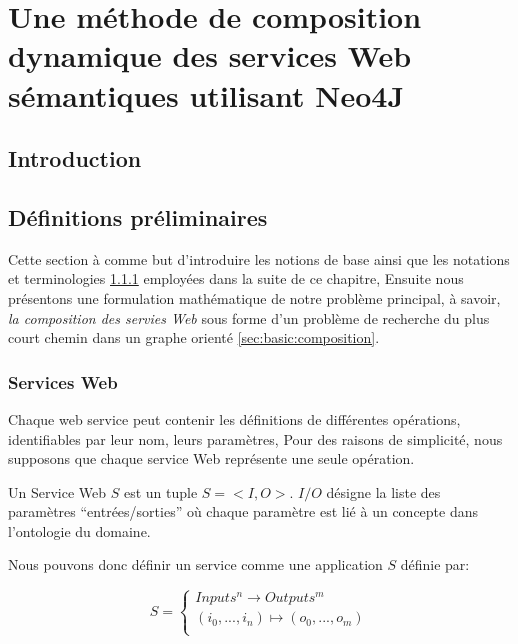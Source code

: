 \chapter{Une méthode de composition dynamique des services Web sémantiques utilisant Neo4J}
\label{ch:approche}

\section*{Introduction}
 

\newpage
\section{Définitions préliminaires}
\label{sec:basic-defs}
Cette section à comme but d'introduire les notions de base ainsi que
les notations et terminologies \ref{sec:basic:ws} employées dans la
suite de ce chapitre, Ensuite nous présentons une formulation
mathématique de notre problème principal, à savoir, \textit{la
  composition des servies Web} sous forme d'un problème de recherche
du plus court chemin dans un graphe orienté
\ref{sec:basic:composition}.\medskip

  \subsection{Services Web}
  \label{sec:basic:ws}
  Chaque web service peut contenir les définitions de différentes
  opérations, identifiables par leur nom, leurs paramètres, Pour des
  raisons de simplicité, nous supposons que chaque service Web
  représente une seule opération.

  \begin{mydef}
   \label{def:ws}
    Un Service Web $S$ est un tuple $S = <I,O>$. $I/O$ désigne la
    liste des paramètres ``entrées/sorties'' où chaque paramètre est
    lié à un concepte dans l'ontologie du domaine.
   \end{mydef}

  

  Nous pouvons donc définir un service comme une application $S$
  définie par:

   \[ S =
     \begin{cases}
       Inputs^n  \to Outputs^m \\
       (i_0, ..., i_n ) \mapsto (o_0, ..., o_m)\\
     \end{cases}
   \]\medskip

